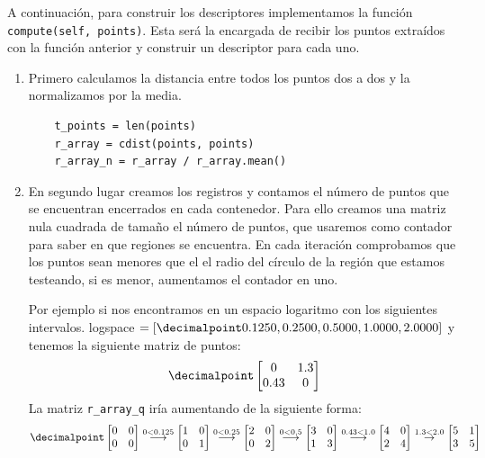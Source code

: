 \documentclass[size=a4, parskip=half, titlepage=false, toc=flat, toc=bib, 12pt]{scrartcl}
\begin{document}
A continuación, para construir los descriptores implementamos la función \texttt{compute(self, points)}. Esta será la encargada de recibir los puntos extraídos con la función anterior y construir un descriptor para cada uno.
\begin{enumerate}
\item Primero calculamos la distancia entre todos los puntos dos a dos y la normalizamos por la media.

\begin{verbatim}
    t_points = len(points)
    r_array = cdist(points, points)
    r_array_n = r_array / r_array.mean()
\end{verbatim}

\item En segundo lugar creamos los registros y contamos el número de puntos que se encuentran encerrados en cada contenedor. Para ello creamos una matriz nula cuadrada de tamaño el número de puntos, que usaremos como contador para saber en que regiones se encuentra. En cada iteración comprobamos que los puntos sean menores que el el radio del círculo de la región que estamos testeando, si es menor, aumentamos el contador en uno.

Por ejemplo si nos encontramos en un espacio logaritmo con los siguientes intervalos.
logspace $= [\decimalpoint 0.1250, 0.2500, 0.5000, 1.0000, 2.0000]$ y tenemos la siguiente matriz de puntos:
$$\decimalpoint \begin{bmatrix}
0 & 1.3 \\
0.43 & 0
\end{bmatrix}$$
La matriz \verb|r_array_q| iría aumentando de la siguiente forma:
$$\decimalpoint \begin{bmatrix}
0 & 0 \\
0 & 0
\end{bmatrix} \stackrel{0 < 0.125}{\longrightarrow} \begin{bmatrix}
1 & 0 \\
0 & 1
\end{bmatrix} \stackrel{0 < 0.25}{\longrightarrow} \begin{bmatrix}
2 & 0 \\
0 & 2
\end{bmatrix} \stackrel{0 < 0.5}{\longrightarrow} \begin{bmatrix}
3 & 0 \\
1 & 3
\end{bmatrix} \stackrel{0.43 < 1.0}{\longrightarrow} \begin{bmatrix}
4 & 0 \\
2 & 4
\end{bmatrix} \stackrel{1.3 < 2.0}\rightarrow \begin{bmatrix}
5 & 1 \\
3 & 5
\end{bmatrix}$$


\end{enumerate}
\end{document}
